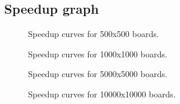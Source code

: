 \documentclass[a4paper,10pt]{article}
\begin{document}
	\subsection{Speedup graph}
	\begin{figure}[H]
		\centering
		\begin{minipage}[t]{0.55\linewidth}
		\end{minipage}%
		\begin{minipage}[t]{0.55\linewidth}
		\end{minipage}
		\caption{Speedup curves for 500x500 boards.}
		\label{500}
	\end{figure}

	\begin{figure}[H]
		\centering
		\begin{minipage}[t]{0.55\linewidth}
		\end{minipage}%
		\begin{minipage}[t]{0.55\linewidth}
		\end{minipage}
		\caption{Speedup curves for 1000x1000 boards.}
		\label{1000}
	\end{figure}

		\begin{figure}[H]
		\centering
		\begin{minipage}[t]{0.55\linewidth}
		\end{minipage}%
		\begin{minipage}[t]{0.55\linewidth}
		\end{minipage}
		\caption{Speedup curves for 5000x5000 boards.}
		\label{5000}
	\end{figure}

		\begin{figure}[H]
		\centering
		\begin{minipage}[t]{0.55\linewidth}
		\end{minipage}%
		\begin{minipage}[t]{0.55\linewidth}
		\end{minipage}
		\caption{Speedup curves for 10000x10000 boards.}
		\label{10000}
	\end{figure}
\end{document}
